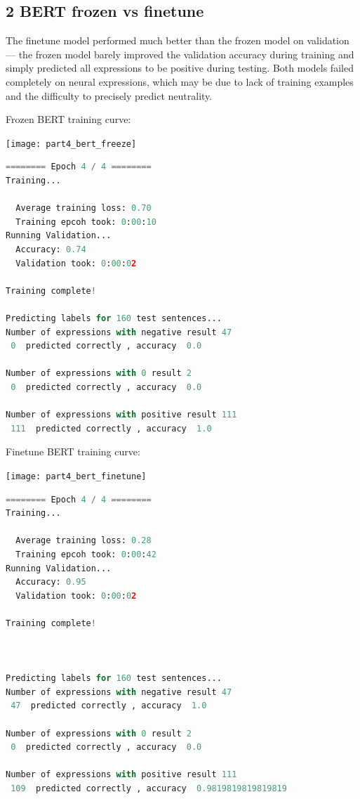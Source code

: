 \documentclass{article}
\begin{document}
\subsection*{2 BERT frozen vs finetune}

The finetune model performed much better than the frozen model on validation --- the frozen model barely improved the validation accuracy during training and simply predicted all expressions to be positive during testing. Both models failed completely on neural expressions, which may be due to lack of training examples and the difficulty to precisely predict neutrality.

Frozen BERT training curve:

\texttt{[image: part4\_bert\_freeze]}

\begin{lstlisting}[language=Python]
======== Epoch 4 / 4 ========
Training...

  Average training loss: 0.70
  Training epcoh took: 0:00:10
Running Validation...
  Accuracy: 0.74
  Validation took: 0:00:02

Training complete!

Predicting labels for 160 test sentences...
Number of expressions with negative result 47 
 0  predicted correctly , accuracy  0.0 

Number of expressions with 0 result 2 
 0  predicted correctly , accuracy  0.0 

Number of expressions with positive result 111 
 111  predicted correctly , accuracy  1.0 

\end{lstlisting}

Finetune BERT training curve:

\texttt{[image: part4\_bert\_finetune]}

\begin{lstlisting}[language=Python]
======== Epoch 4 / 4 ========
Training...

  Average training loss: 0.28
  Training epcoh took: 0:00:42
Running Validation...
  Accuracy: 0.95
  Validation took: 0:00:02

Training complete!



Predicting labels for 160 test sentences...
Number of expressions with negative result 47 
 47  predicted correctly , accuracy  1.0 

Number of expressions with 0 result 2 
 0  predicted correctly , accuracy  0.0 

Number of expressions with positive result 111 
 109  predicted correctly , accuracy  0.9819819819819819 

\end{lstlisting}
\end{document}
